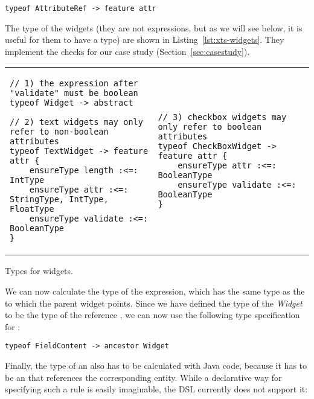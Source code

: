 \begin{lstlisting}[language=xts]
typeof AttributeRef -> feature attr
\end{lstlisting}

The type of the widgets (they are not expressions, but as we will see below, it
is useful for them to have a type) are shown in Listing~\ref{lst:xts-widgets}.
They implement the checks for our case study (Section~\ref{sec:casestudy}).

\begin{listing}[tb]
\begin{tabular}{l@{\hspace{.5cm}}l}
\begin{lstlisting}[language=xts,boxpos=t] 
// 1) the expression after "validate" must be boolean
typeof Widget -> abstract

// 2) text widgets may only refer to non-boolean attributes 
typeof TextWidget -> feature attr {
    ensureType length :<=: IntType
    ensureType attr :<=: StringType, IntType, FloatType
    ensureType validate :<=: BooleanType
}  
\end{lstlisting}
&
\begin{lstlisting}[language=xts,boxpos=t] 
// 3) checkbox widgets may only refer to boolean attributes
typeof CheckBoxWidget -> feature attr {
    ensureType attr :<=: BooleanType
    ensureType validate :<=: BooleanType
}
\end{lstlisting}
\end{tabular}
\vspace{-3.5ex}
\caption{Types for widgets.}
\label{lst:xts-widgets}
\end{listing}

We can now calculate the type of the  expression, which has the
same type as the  to which the parent widget points. Since we have
defined the type of the \emph{Widget} to be the type of the reference , we can
now use the following type specification for :

\begin{lstlisting}[language=xts]
typeof FieldContent -> ancestor Widget
\end{lstlisting}

Finally, the type of an  also has to be calculated with Java code, because
it has to be an  that references the corresponding entity. While
a declarative way for specifying such a rule is easily imaginable, the DSL
currently does not support it:

